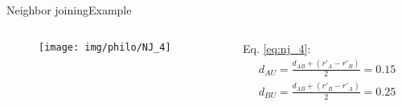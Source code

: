 \documentclass[10pt]{beamer}
\newcommand{\1}{
	\setbeamertemplate{background}{
		\texttt{[image: img/1]}
		\tikz[overlay] \fill[fill opacity=0.75,fill=white] (0,0) rectangle (-\paperwidth,\paperheight);
	}
}
\begin{document}
\begin{frame}{Neighbor joining}{Example}
	\begin{columns}
		\begin{column}{0.48\textwidth}
			\begin{figure}
				\texttt{[image: img/philo/NJ\_4]}
			\end{figure}
		\end{column}
		\begin{column}{0.48\textwidth}
			Eq. \ref{eq:nj_4}:
			\begin{equation*}
				\begin{split}				
					d_{AU} = \frac{ d_{AB} + ( r'_A - r'_B ) }{2} = 0.15 \\
					d_{BU} = \frac{ d_{AB} + ( r'_B - r'_A ) }{2} = 0.25 \\
				\end{split}
			\end{equation*} 	
		\end{column}
	\end{columns}
\end{frame}
\end{document}
